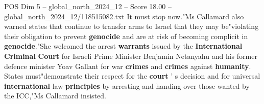 \begin{textsample}{POS Dim 5 – global\_north\_2024\_12 – Score 18.00 – global\_north\_2024\_12/118515082.txt}
It must stop now."Ms Callamard also warned states that continue to transfer arms to Israel that they may be"violating their obligation to prevent \textbf{genocide} and are at risk of becoming complicit in \textbf{genocide}."She welcomed the arrest \textbf{warrants} issued by the \textbf{International} \textbf{Criminal} \textbf{Court} for Israeli Prime Minister Benjamin Netanyahu and his former defence minister Yoav Gallant for war \textbf{crimes} and \textbf{crimes} against \textbf{humanity}.
States must"demonstrate their respect for the \textbf{court} ' s decision and for universal \textbf{international} law \textbf{principles} by arresting and handing over those wanted by the ICC,"Ms Callamard insisted.

\end{textsample}

